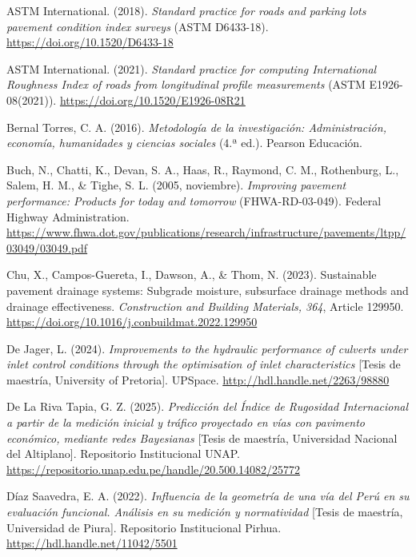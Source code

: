 \begin{list}{}{%
  \setlength{\leftmargin}{1.27cm}%
  \setlength{\itemindent}{-1.27cm}%
  \setlength{\itemsep}{6pt}%
  \setlength{\parsep}{0pt}%
  \setlength{\emergencystretch}{2em}%
}
\item ASTM International. (2018). \textit{Standard practice for roads and parking lots pavement condition index surveys} (ASTM D6433-18). \url{https://doi.org/10.1520/D6433-18}
\item ASTM International. (2021). \textit{Standard practice for computing International Roughness Index of roads from longitudinal profile measurements} (ASTM E1926-08(2021)). \url{https://doi.org/10.1520/E1926-08R21}
\item Bernal Torres, C. A. (2016). \textit{Metodología de la investigación: Administración, economía, humanidades y ciencias sociales} (4.ª ed.). Pearson Educación.
\item Buch, N., Chatti, K., Devan, S. A., Haas, R., Raymond, C. M., Rothenburg, L., Salem, H. M., \& Tighe, S. L. (2005, noviembre). \textit{Improving pavement performance: Products for today and tomorrow} (FHWA-RD-03-049). Federal Highway Administration. \url{https://www.fhwa.dot.gov/publications/research/infrastructure/pavements/ltpp/03049/03049.pdf}
\item Chu, X., Campos-Guereta, I., Dawson, A., \& Thom, N. (2023). Sustainable pavement drainage systems: Subgrade moisture, subsurface drainage methods and drainage effectiveness. \textit{Construction and Building Materials, 364}, Article 129950. \url{https://doi.org/10.1016/j.conbuildmat.2022.129950}
\item De Jager, L. (2024). \textit{Improvements to the hydraulic performance of culverts under inlet control conditions through the optimisation of inlet characteristics} [Tesis de maestría, University of Pretoria]. UPSpace. \url{http://hdl.handle.net/2263/98880}
\item De La Riva Tapia, G. Z. (2025). \textit{Predicción del Índice de Rugosidad Internacional a partir de la medición inicial y tráfico proyectado en vías con pavimento económico, mediante redes Bayesianas} [Tesis de maestría, Universidad Nacional del Altiplano]. Repositorio Institucional UNAP. \url{https://repositorio.unap.edu.pe/handle/20.500.14082/25772}
\item Díaz Saavedra, E. A. (2022). \textit{Influencia de la geometría de una vía del Perú en su evaluación funcional. Análisis en su medición y normatividad} [Tesis de maestría, Universidad de Piura]. Repositorio Institucional Pirhua. \url{https://hdl.handle.net/11042/5501}

\end{list}
